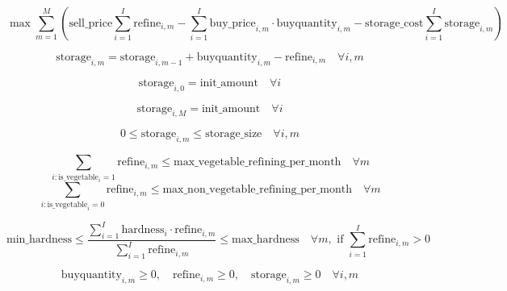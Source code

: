 \documentclass{article}
\begin{document}

\[
\max \sum_{m=1}^{M} \left( \text{sell\_price} \sum_{i=1}^{I} \text{refine}_{i,m} - \sum_{i=1}^{I} \text{buy\_price}_{i,m} \cdot \text{buyquantity}_{i,m} - \text{storage\_cost} \sum_{i=1}^{I} \text{storage}_{i,m} \right)
\]


\[
\text{storage}_{i,m} = \text{storage}_{i,m-1} + \text{buyquantity}_{i,m} - \text{refine}_{i,m} \quad \forall i, m
\]

\[
\text{storage}_{i,0} = \text{init\_amount} \quad \forall i
\]

\[
\text{storage}_{i,M} = \text{init\_amount} \quad \forall i
\]

\[
0 \leq \text{storage}_{i,m} \leq \text{storage\_size} \quad \forall i, m
\]

\[
\sum_{i: \text{is\_vegetable}_{i} = 1} \text{refine}_{i,m} \leq \text{max\_vegetable\_refining\_per\_month} \quad \forall m
\]
\[
\sum_{i: \text{is\_vegetable}_{i} = 0} \text{refine}_{i,m} \leq \text{max\_non\_vegetable\_refining\_per\_month} \quad \forall m
\]

\[
\text{min\_hardness} \leq \frac{\sum_{i=1}^{I} \text{hardness}_{i} \cdot \text{refine}_{i,m}}{\sum_{i=1}^{I} \text{refine}_{i,m}} \leq \text{max\_hardness} \quad \forall m, \text{ if } \sum_{i=1}^{I} \text{refine}_{i,m} > 0
\]

\[
\text{buyquantity}_{i,m} \geq 0, \quad \text{refine}_{i,m} \geq 0, \quad \text{storage}_{i,m} \geq 0 \quad \forall i, m
\]
\end{document}
